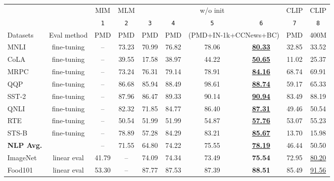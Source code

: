 \documentclass[10pt,twocolumn,letterpaper]{article}
\begin{document}
\begin{table*}[t]
\vspace{-1.5em}
\centering
\footnotesize
\begin{tabular}{l@{\ }c|ccccccc|c}
\toprule
&  & \multicolumn{1}{c}{MIM} & \multicolumn{1}{c}{MLM} &
\multicolumn{1}{c}{} & \multicolumn{1}{c}{}  & \multicolumn{1}{c}{ w/o init} & \multicolumn{1}{c}{} & \multicolumn{1}{c|}{CLIP} & \multicolumn{1}{c}{CLIP} \\
&  & \small\texttt{1} & \small\texttt{2} & \small\texttt{3} & \small\texttt{4} & \small\texttt{5} & \small\texttt{6} & \small\texttt{7} & \small\texttt{8}   \\
\midrule 
Datasets & Eval method &  PMD & PMD &  PMD & PMD & \multicolumn{2}{c}{(PMD+IN-1k+CCNews+BC)} & PMD & 400M\cite{radford2021learning} \\
\midrule 
MNLI \cite{williams2018broad} & fine-tuning & -- & 73.23 & 70.99 & 76.82 & 78.06 & \underline{\textbf{80.33}} & 32.85 & 33.52 \\
CoLA \cite{warstadt2019neural} & fine-tuning & -- & 39.55 & 17.58 & 38.97 & 44.22 & \underline{\textbf{50.65}} & 11.02 & 25.37 \\
MRPC \cite{mrpc2005} & fine-tuning & -- & 73.24 & 76.31 & 79.14 & 78.91 & \underline{\textbf{84.16}} & 68.74 & 69.91 \\
QQP \cite{qqp} & fine-tuning & -- & 86.68 & 85.94 & 88.49 & 98.61 & \underline{\textbf{88.74}} & 59.17 & 65.33 \\
SST-2 \cite{sst2013} & fine-tuning & -- & 87.96 & 86.47 & 89.33 & 90.14 & \underline{\textbf{90.94}} & 83.49 & 88.19 \\
QNLI \cite{rajpurkar2016squad} & fine-tuning & -- & 82.32 & 71.85 & 84.77 & 86.40 & \underline{\textbf{87.31}} & 49.46 & 50.54 \\
RTE \cite{dagan2006pascal,bar2006second,giampiccolo2007third,bentivogli2009fifth} & fine-tuning & -- & 50.54 & 51.99 & 51.99 & 54.87 & \underline{\textbf{57.76}} & 53.07 & 55.23 \\
STS-B \cite{agirre2007semantic} & fine-tuning & -- & 78.89 & 57.28 & 84.29 & 83.21 & \underline{\textbf{85.67}} & 13.70 & 15.98 \\
\midrule 
\textbf{NLP Avg.} &  & -- & 71.55 & 64.80 & 74.22 & 75.55 & \underline{\textbf{78.19}} & 46.44 & 50.50 \\
\midrule 
ImageNet \cite{imagenet} & linear eval & 41.79 & -- & 74.09 & 74.34 & 73.49 & \textbf{75.54} & 72.95 & \underline{80.20} \\
Food101 \cite{bossard14} & linear eval & 53.30 & -- & 87.77 & 87.53 & 87.39 & \textbf{88.51} & 85.49 & \underline{91.56} \\

\end{tabular}
\end{table*}
\end{document}
